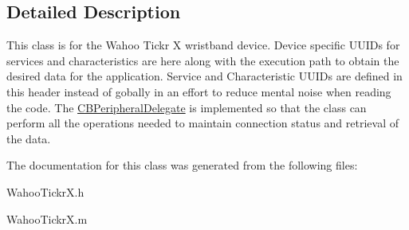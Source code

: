 \subsection{Detailed Description}
This class is for the Wahoo Tickr X wristband device. Device specific U\-U\-I\-Ds for services and characteristics are here along with the execution path to obtain the desired data for the application. Service and Characteristic U\-U\-I\-Ds are defined in this header instead of gobally in an effort to reduce mental noise when reading the code. The \hyperlink{class_c_b_peripheral_delegate-p}{C\-B\-Peripheral\-Delegate} is implemented so that the class can perform all the operations needed to maintain connection status and retrieval of the data. 

The documentation for this class was generated from the following files\-:\begin{DoxyCompactItemize}
\item 
Wahoo\-Tickr\-X.\-h\item 
Wahoo\-Tickr\-X.\-m\end{DoxyCompactItemize}
